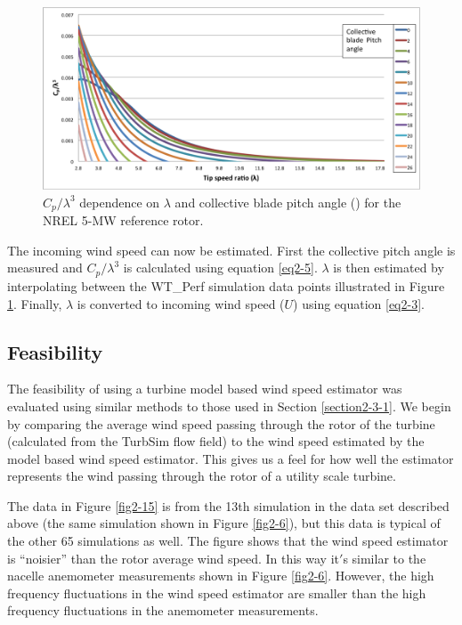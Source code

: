 \begin{figure}[ht]
	\centering
		\includegraphics[width=\textwidth]{Figures/ch2Figures/fig2-14.png}
		
	\caption{$C_p / \lambda^3$ dependence on $\lambda$ and collective blade pitch angle (\degree) for the NREL 5-MW reference rotor.}
	\label{fig2-14}
\end{figure}

The incoming wind speed can now be estimated. First the collective pitch angle is measured and $C_p / \lambda^3$ is calculated using equation \ref{eq2-5}. $\lambda$ is then estimated by interpolating between the WT\_Perf simulation data points illustrated in Figure \ref{fig2-14}. Finally, $\lambda$ is converted to incoming wind speed ($U$) using equation \ref{eq2-3}. 


\subsection{Feasibility} \label{section2-4-1} 

The feasibility of using a turbine model based wind speed estimator was evaluated using similar methods to those used in Section \ref{section2-3-1}. We begin by comparing the average wind speed passing through the rotor of the turbine (calculated from the TurbSim flow field) to the wind speed estimated by the model based wind speed estimator.  This gives us a feel for how well the estimator represents the wind passing through the rotor of a utility scale turbine.

The data in Figure \ref{fig2-15} is from the 13th simulation in the data set described above (the same simulation shown in Figure \ref{fig2-6}), but this data is typical of the other 65 simulations as well. The figure shows that the wind speed estimator is ``noisier'' than the rotor average wind speed. In this way it$'$s similar to the nacelle anemometer measurements shown in Figure \ref{fig2-6}. However, the high frequency fluctuations in the wind speed estimator are smaller than the high frequency fluctuations in the anemometer measurements. 

